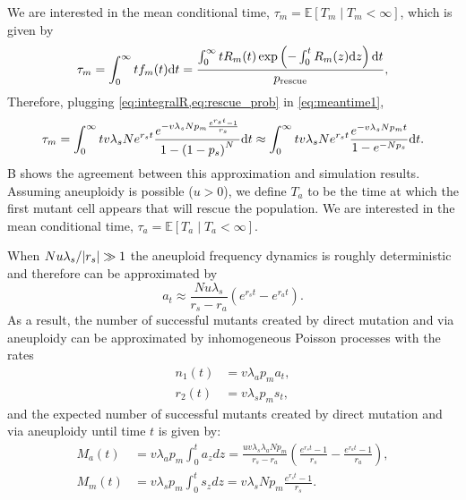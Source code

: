 \documentclass[12pt]{extarticle}
\renewcommand{\d}[1]{\ensuremath{\operatorname{d}\!{#1}}}
\renewcommand{\d}{{\rm d}}
\newcommand{\e}{e}
\newcommand{\presc}{p_\text{rescue}}
\renewcommand{\Delta}{r}
\begin{document}
\begin{appendices}
We are interested in the mean conditional time, $\tau_m=\mathbb{E}\left[T_m \mid T_m<\infty\right]$, which is given by
\begin{equation}\label{eq:meantime1}
\begin{aligned}
\tau_m =
\int_{0}^{\infty}{t f_m(t) \d t} = 
\frac{\int_{0}^{\infty}{tR_m(t)\exp\left(-\int_0^{t}{R_m(z)\d z}\right) \d t}}{\presc},
\end{aligned}
\end{equation}
Therefore, plugging \cref{eq:integralR,eq:rescue_prob} in \cref{eq:meantime1}, 
\begin{align}\label{eq:limitapprox_appendix}
\tau_m = 
\int_0^\infty tv\lambda_s N\e^{\Delta_st}\frac{\e^{-v\lambda_s N p_m\frac{\e^{\Delta_s t}-1}{\Delta_s}} }{1-\left(1-p_s\right)^N} \d t\approx
\int_{0}^{\infty} tv\lambda_s N\e^{\Delta_st}\frac{\e^{-v\lambda_s N p_mt} }{1-\e^{-Np_s}}\d t. 
\end{align}
B shows the agreement between this approximation and simulation results. %
\\
Assuming aneuploidy is possible ($u>0$), we define $T_a$ to be the time at which the first mutant cell appears that will rescue the population. We are interested in the mean conditional time, $\tau_a=\mathbb{E}\left[T_a \mid T_a<\infty\right]$.

When $Nu\lambda_s/\abs{\Delta_s}\gg1$ the aneuploid frequency dynamics is roughly deterministic and therefore can be approximated by 
\begin{equation}\label{aneuploidpopeq}
a_t \approx \frac{Nu\lambda_s}{\Delta_s-\Delta_a}\left(\e^{\Delta_st}-\e^{\Delta_a t}\right).
\end{equation}
As a result, the number of successful mutants created by direct mutation and via aneuploidy can be approximated by inhomogeneous Poisson processes with the rates
\begin{align*}
n_1\left(t\right)&=v\lambda_ap_ma_{t},\\
r_2\left(t\right)&=v\lambda_sp_ms_{t},
\end{align*}
and the expected number of successful mutants created by direct mutation and via aneuploidy until time $t$ is given by:
\begin{align}
M_a\left(t\right)&=v\lambda_ap_m\int_0^ta_{z} d z = \frac{uv\lambda_s\lambda_aNp_m}{\Delta_s-\Delta_a}\left(\frac{\e^{\Delta_st}-1}{\Delta_s}-\frac{\e^{\Delta_at}-1}{\Delta_a}\right),\label{eq:twosteplineage}\\ 
M_m\left(t\right)&=v\lambda_sp_m\int_0^ts_{z} d z = v\lambda_sNp_m\frac{\e^{\Delta_s t}-1}{\Delta_s}.\label{eq:twosteplineagedirect}
\end{align} %


\end{appendices}
\end{document}
